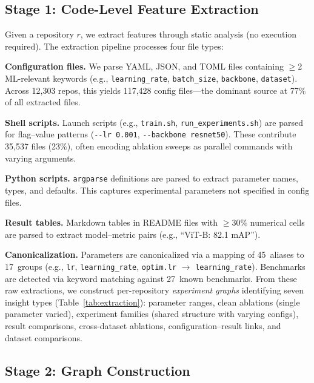 \documentclass[conference]{IEEEtran}
\begin{document}
\subsection{Stage 1: Code-Level Feature Extraction}

Given a repository $r$, we extract features through static analysis (no execution required).
The extraction pipeline processes four file types:

\textbf{Configuration files.}
We parse YAML, JSON, and TOML files containing $\geq$2 ML-relevant keywords (e.g., \texttt{learning\_rate}, \texttt{batch\_size}, \texttt{backbone}, \texttt{dataset}).
Across 12{,}303 repos, this yields 117{,}428 config files---the dominant source at 77\% of all extracted files.

\textbf{Shell scripts.}
Launch scripts (e.g., \texttt{train.sh}, \texttt{run\_experiments.sh}) are parsed for flag--value patterns (\texttt{-{}-lr 0.001}, \texttt{-{}-backbone resnet50}).
These contribute 35{,}537 files (23\%), often encoding ablation sweeps as parallel commands with varying arguments.

\textbf{Python scripts.}
\texttt{argparse} definitions are parsed to extract parameter names, types, and defaults.
This captures experimental parameters not specified in config files.

\textbf{Result tables.}
Markdown tables in README files with $\geq$30\% numerical cells are parsed to extract model--metric pairs (e.g., ``ViT-B: 82.1 mAP'').

\textbf{Canonicalization.}
Parameters are canonicalized via a mapping of 45~aliases to 17~groups (e.g., \texttt{lr}, \texttt{learning\_rate}, \texttt{optim.lr} $\rightarrow$ \texttt{learning\_rate}).
Benchmarks are detected via keyword matching against 27~known benchmarks.
From these raw extractions, we construct per-repository \emph{experiment graphs} identifying seven insight types (Table~\ref{tab:extraction}): parameter ranges, clean ablations (single parameter varied), experiment families (shared structure with varying configs), result comparisons, cross-dataset ablations, configuration--result links, and dataset comparisons.


\subsection{Stage 2: Graph Construction}
\end{document}
